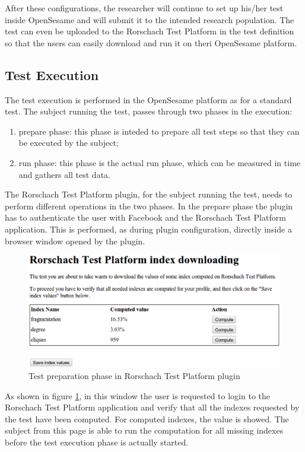 After these configurations, the researcher will continue to set up his/her test inside OpenSesame and will submit it to the intended research population.
The test can even be uploaded to the Rorschach Test Platform in the test definition so that the users can easily download and run it on theri OpenSesame platform.

\label{sec:testexecution}
\subsection{Test Execution}
The test execution is performed in the OpenSesame platform as for a standard test.
The subject running the test, passes through two phases in the execution:

\begin{enumerate}
\item prepare phase: this phase is inteded to prepare all test steps so that they can be executed by the subject;
\item run phase: this phase is the actual run phase, which can be measured in time and gathers all test data.
\end{enumerate}

The Rorschach Test Platform plugin, for the subject running the test, needs to perform different operations in the two phases.
In the prepare phase the plugin has to authenticate the user with Facebook and the Rorschach Test Platform application.
This is performed, as during plugin configuration, directly inside a browser window opened by the plugin.\\

\begin{figure}[h]
\centering
\includegraphics[width=12cm]{Fig3indexeval.eps}
\caption{Test preparation phase in Rorschach Test Platform plugin}
\label{fig:indexeval}
\end{figure}

As shown in figure \ref{fig:indexeval}, in this window the user is requested to login to the Rorschach Test Platform application and verify that all the indexes requested
by the test have been computed.
For computed indexes, the value is showed.
The subject from this page is able to run the computation for all missing indexes before the test execution phase is actually started.\\


